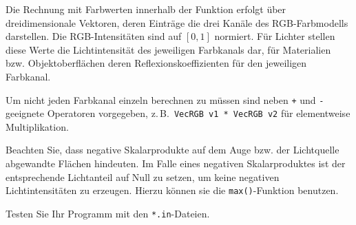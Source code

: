 Die Rechnung mit Farbwerten innerhalb der Funktion erfolgt über
dreidimensionale Vektoren, deren Einträge die drei Kanäle des
RGB-Farbmodells darstellen. Die RGB-Intensitäten sind auf $[0, 1]$ 
normiert. Für Lichter stellen diese Werte die Lichtintensität des 
jeweiligen Farbkanals dar, für Materialien bzw. Objektoberflächen deren
Reflexionskoeffizienten für den jeweiligen Farbkanal.

Um nicht jeden Farbkanal einzeln berechnen zu müssen sind neben
\texttt{+} und \texttt{-} geeignete Operatoren vorgegeben,
z.\,B.\ \texttt{VecRGB v1 * VecRGB v2} für elementweise Multiplikation.

Beachten Sie, dass negative Skalarprodukte auf dem Auge bzw. der
Lichtquelle abgewandte Flächen hindeuten. Im Falle eines negativen 
Skalarproduktes ist der entsprechende Lichtanteil auf Null zu setzen, 
um keine negativen Lichtintensitäten zu erzeugen. Hierzu können sie die 
\texttt{max()}-Funktion benutzen.

Testen Sie Ihr Programm mit den \texttt{*.in}-Dateien.
